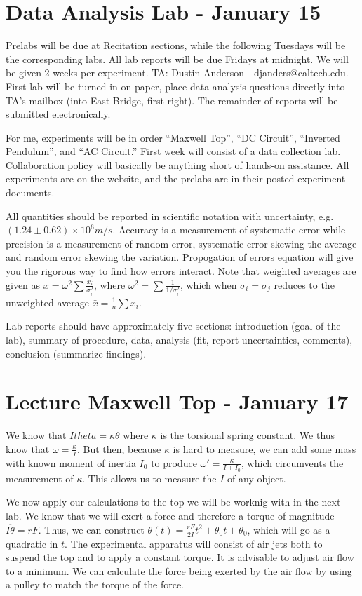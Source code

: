 \documentclass{article}
\begin{document}
\section{Data Analysis Lab - January 15}

Prelabs will be due at Recitation sections, while the following Tuesdays will be the corresponding labs. All lab reports will be due Fridays at midnight. We will be given 2 weeks per experiment. TA: Dustin Anderson - djanders@caltech.edu. First lab will be turned in on paper, place data analysis questions directly into TA's mailbox (into East Bridge, first right). The remainder of reports will be submitted electronically. 

For me, experiments will be in order ``Maxwell Top'', ``DC Circuit'', ``Inverted Pendulum'', and ``AC Circuit.'' First week will consist of a data collection lab. Collaboration policy will basically be anything short of hands-on assistance. All experiments are on the website, and the prelabs are in their posted experiment documents. 

All quantities should be reported in scientific notation with uncertainty, e.g. $(1.24 \pm 0.62) \times 10^6 m/s$. Accuracy is a measurement of systematic error while precision is a measurement of random error, systematic error skewing the average and random error skewing the variation. Propogation of errors equation will give you the rigorous way to find how errors interact. Note that weighted averages are given as $\bar{x} = \omega^2\sum{\frac{x_i}{\sigma_i^2}}$, where $\omega^2 = \sum\frac{1}{1/\sigma_i^2}$, which when $\sigma_i = \sigma_j$ reduces to the unweighted average $\bar{x} = \frac{1}{n}\sum x_i$.

Lab reports should have approximately five sections: introduction (goal of the lab), summary of procedure, data, analysis (fit, report uncertainties, comments), conclusion (summarize findings).

\section{Lecture Maxwell Top - January 17}

We know that $I\ddot{theta} = \kappa\theta$ where $\kappa$ is the torsional spring constant. We thus know that $\omega = \frac{\kappa}{I}$. But then, because $\kappa$ is hard to measure, we can add some mass with known moment of inertia $I_0$ to produce $\omega' = \frac{\kappa}{I + I_0}$, which circumvents the measurement of $\kappa$. This allows us to measure the $I$ of any object.

We now apply our calculations to the top we will be worknig with in the next lab. We know that we will exert a force and therefore a torque of magnitude $I\ddot{\theta} = rF$. Thus, we can construct $\theta(t) = \frac{rF}{2I}t^2 + \dot{\theta}_0t + \theta_0$, which will go as a quadratic in $t$. The experimental apparatus will consist of air jets both to suspend the top and to apply a constant torque. It is advisable to adjust air flow to a minimum. We can calculate the force being exerted by the air flow by using a pulley to match the torque of the force. 
\end{document}
